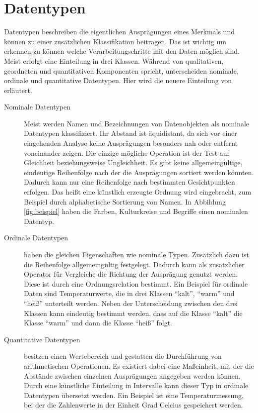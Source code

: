 \documentclass[a4paper, 
               12pt,
               DIV=calc,
               version=first,
               pdftex,
               headsepline,
               footsepline,
               bibtotocnumbered,
               liststotocnumbered]{scrreprt}
\begin{document}
\section{Datentypen}
\label{sec:Datentypen}
Datentypen beschreiben die eigentlichen Ausprägungen eines Merkmals und können zu einer zusätzlichen
Klassifikation beitragen. Das ist wichtig um erkennen zu können welche Verarbeitungschritte mit den Daten
möglich sind. Meist erfolgt eine Einteilung in drei Klassen. Während \cite{Bertin} von qualitativen,
geordneten und quantitativen Komponenten spricht, unterscheiden \cite{Preim} nominale, ordinale und
quantitative Datentypen.
Hier wird die neuere Einteilung von \cite{Preim} erläutert.
\begin{description}
\item[Nominale Datentypen]
Meist werden Namen und Bezeichnungen von Datenobjekten als nominale Datentypen klassifiziert.
Ihr Abstand ist äquidistant, da sich vor einer eingehenden Analyse
keine Ausprägungen besonders nah oder entfernt voneinander zeigen. Die einzige mögliche Operation ist der Test auf
Gleichheit beziehungsweise Ungleichheit. Es gibt keine allgemeingültige, eindeutige Reihenfolge
nach der die Ausprägungen sortiert werden könnten. Dadurch kann nur eine Reihenfolge nach bestimmten Gesichtpunkten erfolgen.
Das heißt eine künstlich erzeugte Ordnung wird eingebracht, zum Beispiel durch alphabetische Sortierung von Namen.
In Abbildung \ref{fig:beispiel} haben die Farben, Kulturkreise und Begriffe einen nominalen Datentyp.
\item[Ordinale Datentypen]
haben die gleichen Eigenschaften wie nominale Typen.
Zusätzlich dazu ist die Reihenfolge allgemeingültig festgelegt. Dadurch kann als zusätzlicher Operator für Vergleiche die Richtung der
Ausprägung genutzt werden. Diese ist durch eine Ordnungsrelation bestimmt. Ein Beispiel für ordinale Daten sind Temperaturwerte,
die in drei Klassen "`kalt"', "`warm"' und "`heiß"' unterteilt werden. Neben der Unterscheidung zwischen den drei
Klassen kann eindeutig bestimmt werden, dass auf die Klasse "`kalt"' die Klasse "`warm"' und dann die Klasse
"`heiß"' folgt. 
\item[Quantitative Datentypen] besitzen einen Wertebereich und gestatten die Durchführung von arithmetischen Operationen.
Es existiert dabei eine Maßeinheit, mit der die Abstände zwischen einzelnen Ausprägungen angegeben werden können. Durch eine 
künstliche Einteilung in Intervalle kann dieser Typ in ordinale Datentypen übersetzt werden.
Ein Beispiel ist eine Temperaturmessung, bei der die Zahlenwerte in der Einheit Grad Celcius gespeichert werden.
\end{description}
\end{document}
